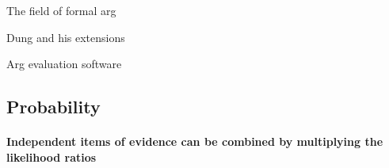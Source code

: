 \documentclass[10pt]{article}
\begin{document}
The field of formal arg

Dung and his extensions

Arg evaluation software








\subsection{Probability}


\paragraph{Independent items of evidence can be combined by multiplying the likelihood ratios}
\end{document}
